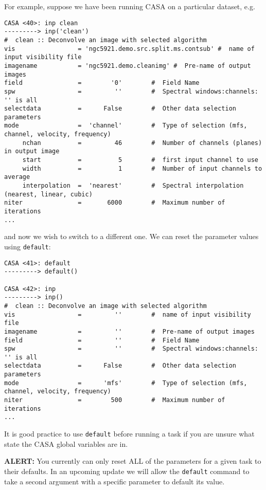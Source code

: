 For example, suppose we have been running CASA on a particular
dataset, e.g.
\small
\begin{verbatim}
CASA <40>: inp clean
---------> inp('clean')
#  clean :: Deconvolve an image with selected algorithm
vis                 = 'ngc5921.demo.src.split.ms.contsub' #  name of input visibility file
imagename           = 'ngc5921.demo.cleanimg' #  Pre-name of output images
field               =        '0'        #  Field Name
spw                 =         ''        #  Spectral windows:channels: '' is all
selectdata          =      False        #  Other data selection parameters
mode                =  'channel'        #  Type of selection (mfs, channel, velocity, frequency)
     nchan          =         46        #  Number of channels (planes) in output image
     start          =          5        #  first input channel to use
     width          =          1        #  Number of input channels to average
     interpolation  =  'nearest'        #  Spectral interpolation (nearest, linear, cubic)
niter               =       6000        #  Maximum number of iterations
...
\end{verbatim}
\normalsize
and now we wish to switch to a different one.  We can reset the
parameter values using {\tt default}:
\small
\begin{verbatim}
CASA <41>: default
---------> default()

CASA <42>: inp
---------> inp()
#  clean :: Deconvolve an image with selected algorithm
vis                 =         ''        #  name of input visibility file
imagename           =         ''        #  Pre-name of output images
field               =         ''        #  Field Name
spw                 =         ''        #  Spectral windows:channels: '' is all
selectdata          =      False        #  Other data selection parameters
mode                =      'mfs'        #  Type of selection (mfs, channel, velocity, frequency)
niter               =        500        #  Maximum number of iterations
...
\end{verbatim}
\normalsize

It is good practice to use {\tt default} before running a task
if you are unsure what state the CASA global variables are in.

{\bf ALERT:} You currently can only reset ALL of the parameters
for a given task to their defaults.  In an upcoming update we will
allow the {\tt default} command to take a second argument with a
specific parameter to default its value.

